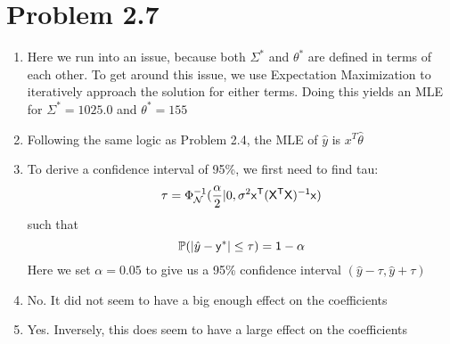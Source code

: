 \documentclass{article}
\begin{document}
\section*{Problem 2.7}
\begin{enumerate}[label=(\alph*)]
  \item Here we run into an issue, because both $\Sigma^*$ and $\theta^*$ are defined in terms of each other. To get around this issue, we use Expectation Maximization to iteratively approach the solution for either terms. Doing this yields an MLE for $\Sigma^* = 1025.0$ and $\theta^* = 155$
  \item Following the same logic as Problem 2.4, the MLE of $\hat{y}$ is $x^T\hat{\theta}$
  \item To derive a confidence interval of 95\%, we first need to find tau: \[ \tau = \Phi^{-1}_\mathcal{N}(\frac{\alpha}{2} | 0, \sigma^2\sf{x}^T(X^TX)^{-1}\sf{x})\] such that \[\mathbb{P}(|\hat{y} - \sf{y}^*| \leq \tau) = 1 - \alpha\] Here we set $\alpha = 0.05$ to give us a 95\% confidence interval $(\hat{y} - \tau, \hat{y} + \tau)$
  \item No. It did not seem to have a big enough effect on the coefficients
  \item Yes. Inversely, this does seem to have a large effect on the coefficients
\end{enumerate}
\end{document}
